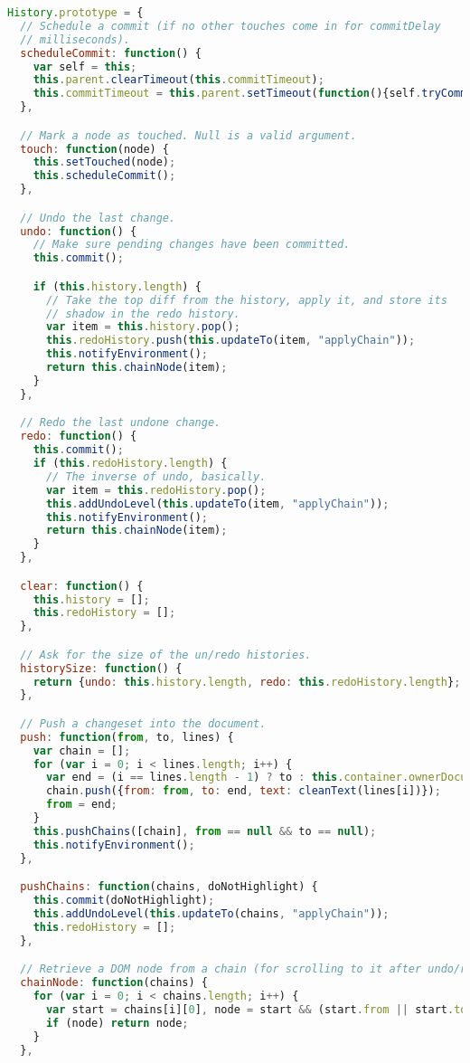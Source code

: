 \begin{lstlisting}[language=Javascript]
History.prototype = {
  // Schedule a commit (if no other touches come in for commitDelay
  // milliseconds).
  scheduleCommit: function() {
    var self = this;
    this.parent.clearTimeout(this.commitTimeout);
    this.commitTimeout = this.parent.setTimeout(function(){self.tryCommit();}, this.commitDelay);
  },

  // Mark a node as touched. Null is a valid argument.
  touch: function(node) {
    this.setTouched(node);
    this.scheduleCommit();
  },

  // Undo the last change.
  undo: function() {
    // Make sure pending changes have been committed.
    this.commit();

    if (this.history.length) {
      // Take the top diff from the history, apply it, and store its
      // shadow in the redo history.
      var item = this.history.pop();
      this.redoHistory.push(this.updateTo(item, "applyChain"));
      this.notifyEnvironment();
      return this.chainNode(item);
    }
  },

  // Redo the last undone change.
  redo: function() {
    this.commit();
    if (this.redoHistory.length) {
      // The inverse of undo, basically.
      var item = this.redoHistory.pop();
      this.addUndoLevel(this.updateTo(item, "applyChain"));
      this.notifyEnvironment();
      return this.chainNode(item);
    }
  },

  clear: function() {
    this.history = [];
    this.redoHistory = [];
  },

  // Ask for the size of the un/redo histories.
  historySize: function() {
    return {undo: this.history.length, redo: this.redoHistory.length};
  },

  // Push a changeset into the document.
  push: function(from, to, lines) {
    var chain = [];
    for (var i = 0; i < lines.length; i++) {
      var end = (i == lines.length - 1) ? to : this.container.ownerDocument.createElement("BR");
      chain.push({from: from, to: end, text: cleanText(lines[i])});
      from = end;
    }
    this.pushChains([chain], from == null && to == null);
    this.notifyEnvironment();
  },

  pushChains: function(chains, doNotHighlight) {
    this.commit(doNotHighlight);
    this.addUndoLevel(this.updateTo(chains, "applyChain"));
    this.redoHistory = [];
  },

  // Retrieve a DOM node from a chain (for scrolling to it after undo/redo).
  chainNode: function(chains) {
    for (var i = 0; i < chains.length; i++) {
      var start = chains[i][0], node = start && (start.from || start.to);
      if (node) return node;
    }
  },


\end{lstlisting}
